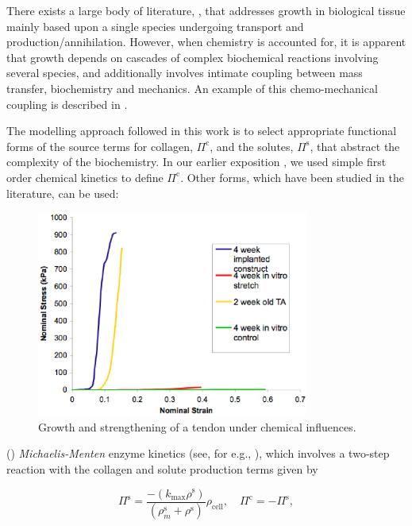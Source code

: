 There exists a large body of literature,
\citep{CowinHegedus:76,EpsteinMaugin:2000,AmbrosiMollica:2002}, that
addresses growth in biological tissue mainly based upon a single
species undergoing transport and production/annihilation. However,
when chemistry is accounted for, it is apparent that growth depends on
cascades of complex biochemical reactions involving several species,
and additionally involves intimate coupling between mass transfer,
biochemistry and mechanics. An example of this chemo-mechanical
coupling is described in \cite{Provenzanoetal:2003}.

The modelling approach followed in this work is to select appropriate
functional forms of the source terms for collagen, $\Pi^{\mathrm{c}}$,
and the solutes, $\Pi^{\mathrm{s}}$, that abstract the complexity of
the biochemistry. In our earlier exposition \citep{growthpaper}, we
used simple first order chemical kinetics to define
$\Pi^{\mathrm{c}}$. Other forms, which have been studied in the
literature, can be used: 

\begin{figure}[!hpt]
\centering
\includegraphics[width=0.8\textwidth]
                {images/experiments/implantation-strengthening} 
\caption{Growth and strengthening of a tendon under chemical influences.}
\label{load-strengthening}
\end{figure}

() {\em Michaelis-Menten}
enzyme kinetics (see, for 
e.g., \cite{Sengersetal:2004}), which involves a two-step reaction
with the collagen and solute production terms given by

\begin{equation}
\Pi^\mathrm{s} =
    \frac{-(k_{\mathrm{max}}\rho^{\mathrm{s}})}
    {(\rho^{\mathrm{s}}_m+\rho^{\mathrm{s}})}
    \rho_{\mathrm{cell}}, \quad\Pi^\mathrm{c} = -\Pi^\mathrm{s},
\label{enzymekineticseq}
\end{equation}

